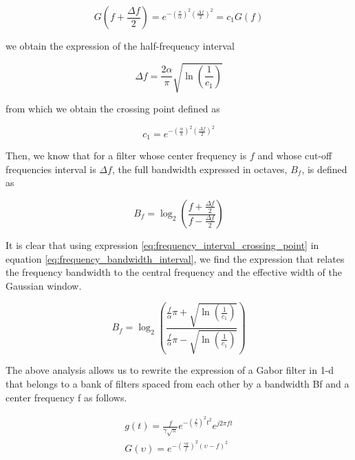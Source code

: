 \begin{equation}\label{eq:constant_crossing_point}
    G\left(f + \frac{\Delta f}{2}\right) = e^{-\left(\frac{\pi}{\alpha}\right)^2 \left(\frac{\Delta f}{2}\right)^2} = c_1 G(f) 
\end{equation}

we obtain the expression of the half-frequency interval 

\begin{equation}\label{eq:frequency_interval_crossing_point}
    \Delta f = \frac{2 \alpha}{\pi}\sqrt{\ln \left(\frac{1}{c_1}\right)}
\end{equation}

from which we obtain the crossing point defined as

\begin{equation}\label{eq:crossing_point}
    c_1 = e^{-\left(\frac{\alpha}{\pi} \right)^2 \left(\frac{\Delta f}{2}\right)^2 }
\end{equation}

Then, we know that for a filter whose center frequency is $f$ and whose cut-off frequencies interval is $\Delta f$, the full bandwidth expressed in octaves, $B_f$, is defined as \cite{Daugman:JOSA:1985a}

\begin{equation}\label{eq:frequency_bandwidth_interval}
    B_f = \log_2 \left( \frac{f + \frac{\Delta f}{2} }{f - \frac{\Delta f}{2}} \right)
\end{equation}

It is clear that using expression \eqref{eq:frequency_interval_crossing_point} in equation \eqref{eq:frequency_bandwidth_interval}, we find the expression that relates the frequency bandwidth to the central frequency and the effective width of the Gaussian window.

\begin{equation}\label{eq:frequency_bandwidth}
    B_f = \log_2 \left( \frac{ \frac{f}{\alpha} \pi + \sqrt{\ln \left(\frac{1}{c_1}\right)} }{ \frac{f}{\alpha} \pi - \sqrt{\ln \left(\frac{1}{c_1}\right)} } \right)
\end{equation}


The above analysis allows us to rewrite the expression of a Gabor filter in 1-d that belongs to a bank of filters spaced from each other by a bandwidth Bf and a center frequency f as follows. 

\begin{equation}\label{eq:gabor_function_1d_timefreq_bank}
    \begin{gathered}
         g(t) =  \frac{f}{\gamma \sqrt{\pi}} e ^{-\left(\frac{f}{\gamma}\right)^2 t^2} e ^{j 2 \pi f t } \\
         G(\upsilon) =  e ^{-\left(\frac{\gamma \pi}{f}\right) ^2 (\upsilon-f)^2}
     \end{gathered}
\end{equation}

